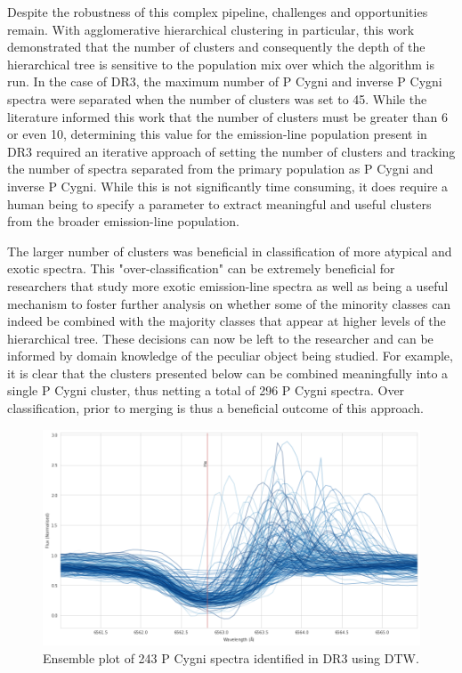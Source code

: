 Despite the robustness of this complex pipeline, challenges and opportunities remain. With agglomerative hierarchical clustering in particular, this work demonstrated that the number of clusters and consequently the depth of the hierarchical tree is sensitive to the population mix over which the algorithm is run. In the case of DR3, the maximum number of P Cygni and inverse P Cygni spectra were separated when the number of clusters was set to 45. While the literature informed this work that the number of clusters must be greater than 6 or even 10, determining this value for the emission-line population present in DR3 required an iterative approach of setting the number of clusters and tracking the number of spectra separated from the primary population as P Cygni and inverse P Cygni. While this is not significantly time consuming, it does require a human being to specify a parameter to extract meaningful and useful clusters from the broader emission-line population. 

The larger number of clusters was beneficial in classification of more atypical and exotic spectra. This "over-classification" can be extremely beneficial for researchers that study more exotic emission-line spectra as well as being a useful mechanism to foster further analysis on whether some of the minority classes can indeed be combined with the majority classes that appear at higher levels of the hierarchical tree. These decisions can now be left to the researcher and can be informed by domain knowledge of the peculiar object being studied. For example, it is clear that the clusters presented below can be combined meaningfully into a single P Cygni cluster, thus netting a total of 296 P Cygni spectra. Over classification, prior to merging is thus a beneficial outcome of this approach. 

\begin{figure}[!htb]
\centering
\includegraphics[scale=0.45]{figures/p cygni ensemble.png}
\caption{Ensemble plot of 243 P Cygni spectra identified in DR3 using DTW.}
\end{figure}

